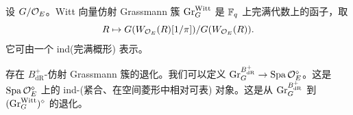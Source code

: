 \begin{remark}
设 $G/\mathcal{O}_E$。Witt 向量仿射 Grassmann 簇 $\mathrm{Gr}^{\mathrm{Witt}}_G$ 是 $\mathbb{F}_q$ 上完满代数上的函子，取
\[
R\mapsto G(W_{\mathcal{O}_E}(R)[1/\pi])/G(W_{\mathcal{O}_E}(R)).
\]
它可由一个 ind(完满概形) 表示。

存在 $B^+_{\mathrm{dR}}$-仿射 Grassmann 簇的退化。我们可以定义 $\mathrm{Gr}^{B^+_{\mathrm{dR}}}_G\to\operatorname{Spa}\mathcal{O}_E^{\diamond}$。这是 $\operatorname{Spa}\mathcal{O}_E^{\diamond}$ 上的 ind-(紧合、在空间菱形中相对可表) 对象。这是从 $\mathrm{Gr}^{B^+_{\mathrm{dR}}}_G$ 到 $(\mathrm{Gr}^{\mathrm{Witt}}_G)^{\diamond}$ 的退化。
\end{remark}
